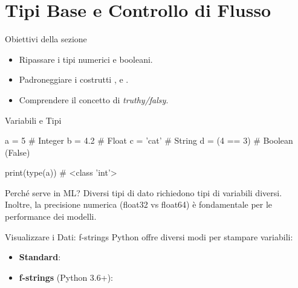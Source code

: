 \documentclass[12pt,aspectratio=169,notheorems]{beamer}
\begin{document}
\section{Tipi Base e Controllo di Flusso}

\begin{frame}{Obiettivi della sezione}
    \begin{itemize}
        \item Ripassare i tipi numerici e booleani.
        \item Padroneggiare i costrutti ,  e .
        \item Comprendere il concetto di \textit{truthy/falsy}.
    \end{itemize}
\end{frame}

\begin{frame}[fragile]{Variabili e Tipi}
    \begin{python}
        a = 5         # Integer
        b = 4.2       # Float
        c = 'cat'     # String
        d = (4 == 3)  # Boolean (False)

        print(type(a)) # <class 'int'>
    \end{python}
    \begin{mlblock}{Perché serve in ML?}
        Diversi tipi di dato richiedono tipi di variabili diversi. Inoltre, la precisione numerica (float32 vs float64) è fondamentale per le performance dei modelli.
    \end{mlblock}
\end{frame}


\begin{frame}[fragile]{Visualizzare i Dati: f-strings}
    Python offre diversi modi per stampare variabili:
    \begin{itemize}
        \item \textbf{Standard}: 
        \item \textbf{f-strings} (Python 3.6+): 
    \end{itemize}

\end{frame}
\end{document}
